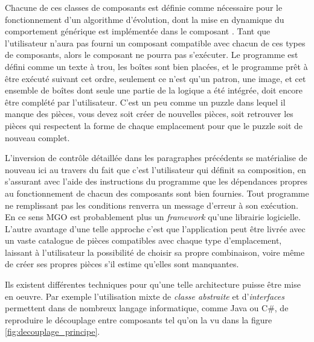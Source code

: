 Chacune de ces classes de composants est définie comme nécessaire pour le fonctionnement d'un algorithme d'évolution, dont la mise en dynamique du comportement générique est implémentée dans le composant . Tant que l'utilisateur n'aura pas fourni un composant compatible avec chacun de ces types de composants, alors le composant  ne pourra pas s'exécuter. Le programme est défini comme un texte à trou, les boîtes sont bien placées, et le programme prêt à être exécuté suivant cet ordre, seulement ce n'est qu'un patron, une image, et cet ensemble de boîtes dont seule une partie de la logique a été intégrée, doit encore être complété par l'utilisateur. C'est un peu comme un puzzle dans lequel il manque des pièces, vous devez soit créer de nouvelles pièces, soit retrouver les pièces qui respectent la forme de chaque emplacement pour que le puzzle soit de nouveau complet.

L'inversion de contrôle détaillée dans les paragraphes précédents se matérialise de nouveau ici au travers du fait que c'est l'utilisateur qui définit sa composition, en s'assurant avec l'aide des instructions du programme que les dépendances propres au fonctionnement de chacun des composants sont bien fournies. Tout programme ne remplissant pas les conditions renverra un message d'erreur à son exécution. En ce sens MGO est probablement plus un \textit{\textit{framework}} qu'une librairie logicielle. L'autre avantage d'une telle approche c'est que l'application peut être livrée avec un vaste catalogue de pièces compatibles avec chaque type d'emplacement, laissant à l'utilisateur la possibilité de choisir sa propre combinaison, voire même de créer ses propres pièces s'il estime qu'elles sont manquantes.

Ils existent différentes techniques pour qu'une telle architecture puisse être mise en oeuvre. Par exemple l'utilisation mixte de \textit{classe abstraite} et d'\textit{interfaces} permettent dans de nombreux langage informatique, comme Java ou C\#, de reproduire le découplage entre composants tel qu'on la vu dans la figure \ref{fig:decouplage_principe}.

